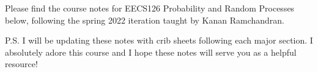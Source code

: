 \documentclass[10pt, article, oneside, margin=1in]{memoir}
\begin{document}
	\maketitle
	
	Please find the course notes for EECS126 Probability and Random Processes below, following the spring 2022 iteration taught by Kanan Ramchandran. 
	
	\medskip
	P.S. I will be updating these notes with crib sheets following each major section. I absolutely adore this course and I hope these notes will serve you as a helpful resource!

	\tableofcontents*
	\newpage
	
	
    
	
	
	
	
	
	
	
	
	
	
	
	
	
	
	
	
	
	
	
	
	
	
	
	
	
	
\end{document}
